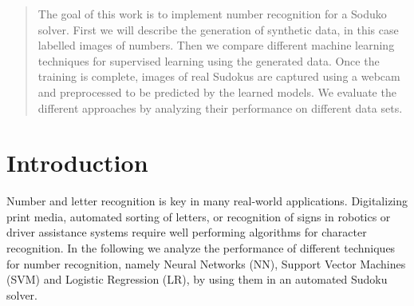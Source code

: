 \documentclass{article}
\begin{document}
 


\begin{abstract}
The goal of this work is to implement number recognition for a Soduko solver.
First we will describe the generation of synthetic data, in this case labelled images of numbers.
Then we compare different machine learning techniques for supervised learning using the generated data.
Once the training is complete, images of real Sudokus are captured using a webcam and preprocessed to be predicted by the learned models. We evaluate the different approaches by analyzing their performance on different data sets.
\end{abstract}

\section{Introduction}
Number and letter recognition is key in many real-world applications. Digitalizing print media, automated sorting of letters, or recognition of signs in robotics or driver assistance systems require well performing algorithms for character recognition. In the following we analyze the performance of different techniques for number recognition, namely Neural Networks (NN), Support Vector Machines (SVM) and Logistic Regression (LR), by using them in an automated Sudoku solver.
\end{document}
